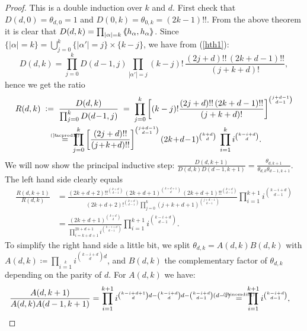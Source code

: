 \begin{proof} This is a double induction over $k$ and $d$. First check that $D(d,0) = \theta_{d,0}=1$ and $D(0,k) = \theta_{0,k} =(2k-1)!!$.
From the above theorem it is clear that $D(d,k)=\prod_{|\alpha | =k}\left<\!\!\!\:\left< h_\alpha ,h_\alpha \right>\!\!\!\:\right>$. Since $\{ |\alpha| = k \} = \bigcup_{j=0}^k  \{ |\alpha'| = j \} \times \{ k-j \}  $, we have from (\ref{hth1}):
$$
D(d,k) = \prod_{j=0}^k D(d\!-\!1,j) \prod_{|\alpha'| = j} (k-j)!\,\frac{(2j+d)!!\,(2k+d-1)!!}{(j+k+d)!},
$$
hence we get the ratio \vspace{-1mm}
\begin{align*}
R(d,k) \;&\coloneqq\; \frac{D(d,k)}{\prod_{j=0}^k D(d\!-\!1,j) } \;=\; \prod_{j=0}^k \left[(k-j)!\frac{(2j+d)!!\,(2k+d-1)!!}{(j+k+d)!} \right]^{\binom{j+d-1}{d-1}} \\
&\qquad\myeq{(\ref{facprod1})}\; \prod_{j=0}^k\left[ \frac{(2j+d)!!}{(j\!+\!k\!+\!d)!!}\right]^{\binom{j+d-1}{d-1}}(2k\!+\!d\!-\!1)^{\binom{k+d}{d}} \;\prod_{i=1}^k i^{\binom{k-i+d}{d}} .
\end{align*}
We will now show the principal inductive step: $\frac{D(d,k+1)}{D(d,k)D(d-1,k+1)}=\frac{\theta_{d,k+1}}{\theta_{d,k}\theta_{d-1,k+1}}$. The left hand side clearly equals
\begin{align*}
 \frac{R(d,k+1)}{R(d,k)} &= \frac{(2k\!+\!d\!+\!2)!!^{\binom{k+d}{d-1}}\,(2k\!+\!d\!+\!1)^{\binom{k+d+1}{d}}\,(2k\!+\!d\!+\!1)!!^{\binom{k+d}{d-1}}}{(2k\!+\!d\!+\!2)!^{\binom{k+d}{d-1}} \prod\limits_{j=0}^k(j\!+\!k\!+\!d\!+\!1)^{\binom{j+d-1}{d-1}}} \prod_{i=1}^{k+1} i^{\binom{k-i+d}{d-1}}\\
&= \frac{(2k+d+1)^{\binom{k+d}{d}}}{\prod\limits_{i=k+d+1}^{2k+d+1}i^{ \binom{k-i+d}{d-1}} }\prod_{i=1}^{k+1} i^{\binom{k-i+d}{d-1}}.
\end{align*}
To simplify the right hand side a little bit, we split $\theta_{d,k} = A(d,k)B(d,k)$ with $A(d,k)\coloneqq\prod_{i=1}\limits^k i^{\binom{k-i+d}{d}d}$, and $B(d,k)$ the complementary factor of $\theta_{d,k}$ depending on the parity of $d$. For $A(d,k)$ we have:
\begin{align*}
\frac{A(d,k+1)}{A(d,k)A(d-1,k+1)} &=
 \prod_{i=1}^{k+1}i^{\binom{k-i+d+1}{d}d-\binom{k-i+d}{d}d -\binom{k-i+d}{d-1}(d-1)} \ 
 \myeq{(\ref{binomdiff})}\ \prod_{i=1}^{k+1} i^{\binom{k-i+d}{d-1}},
\end{align*}

\end{proof}
